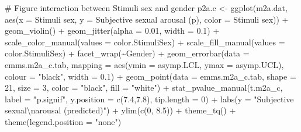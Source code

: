 \documentclass[
  bookmarksnumbered]{article}
\newenvironment{Shaded}{\begin{snugshade}}{\end{snugshade}}
\newcommand{\AttributeTok}[1]{\textcolor[rgb]{0.80,0.80,0.80}{#1}}
\newcommand{\CommentTok}[1]{\textcolor[rgb]{0.50,0.62,0.50}{#1}}
\newcommand{\DecValTok}[1]{\textcolor[rgb]{0.86,0.86,0.80}{#1}}
\newcommand{\FloatTok}[1]{\textcolor[rgb]{0.75,0.75,0.82}{#1}}
\newcommand{\FunctionTok}[1]{\textcolor[rgb]{0.94,0.94,0.56}{#1}}
\newcommand{\NormalTok}[1]{\textcolor[rgb]{0.80,0.80,0.80}{#1}}
\newcommand{\OtherTok}[1]{\textcolor[rgb]{0.94,0.94,0.56}{#1}}
\newcommand{\SpecialCharTok}[1]{\textcolor[rgb]{0.86,0.64,0.64}{#1}}
\newcommand{\StringTok}[1]{\textcolor[rgb]{0.80,0.58,0.58}{#1}}
\begin{document}
\begin{Shaded}
\begin{Highlighting}[]
\CommentTok{\# Figure interaction between Stimuli sex and gender}
\NormalTok{p2a.c }\OtherTok{\textless{}{-}} \FunctionTok{ggplot}\NormalTok{(m2a.dat, }\FunctionTok{aes}\NormalTok{(}\AttributeTok{x =} \StringTok{\textasciigrave{}}\AttributeTok{Stimuli sex}\StringTok{\textasciigrave{}}\NormalTok{, }
                             \AttributeTok{y =} \StringTok{\textasciigrave{}}\AttributeTok{Subjective sexual arousal (p)}\StringTok{\textasciigrave{}}\NormalTok{, }
                             \AttributeTok{color =} \StringTok{\textasciigrave{}}\AttributeTok{Stimuli sex}\StringTok{\textasciigrave{}}\NormalTok{)) }\SpecialCharTok{+}
  \FunctionTok{geom\_violin}\NormalTok{() }\SpecialCharTok{+}
  \FunctionTok{geom\_jitter}\NormalTok{(}\AttributeTok{alpha =} \FloatTok{0.01}\NormalTok{, }\AttributeTok{width =} \FloatTok{0.1}\NormalTok{) }\SpecialCharTok{+}
  \FunctionTok{scale\_color\_manual}\NormalTok{(}\AttributeTok{values =}\NormalTok{ color.StimuliSex) }\SpecialCharTok{+}
  \FunctionTok{scale\_fill\_manual}\NormalTok{(}\AttributeTok{values =}\NormalTok{ color.StimuliSex) }\SpecialCharTok{+}
  \FunctionTok{facet\_wrap}\NormalTok{(}\SpecialCharTok{\textasciitilde{}}\NormalTok{Gender) }\SpecialCharTok{+}
  \FunctionTok{geom\_errorbar}\NormalTok{(}\AttributeTok{data =}\NormalTok{ emms.m2a\_c.tab, }
                \AttributeTok{mapping =} \FunctionTok{aes}\NormalTok{(}\AttributeTok{ymin =}\NormalTok{ asymp.LCL, }\AttributeTok{ymax =}\NormalTok{ asymp.UCL), }
                \AttributeTok{colour =} \StringTok{"black"}\NormalTok{, }\AttributeTok{width =} \FloatTok{0.1}\NormalTok{) }\SpecialCharTok{+}
  \FunctionTok{geom\_point}\NormalTok{(}\AttributeTok{data =}\NormalTok{ emms.m2a\_c.tab, }
             \AttributeTok{shape =} \DecValTok{21}\NormalTok{, }\AttributeTok{size =} \DecValTok{3}\NormalTok{,}
             \AttributeTok{color =} \StringTok{"black"}\NormalTok{, }\AttributeTok{fill =} \StringTok{"white"}\NormalTok{) }\SpecialCharTok{+}
  \FunctionTok{stat\_pvalue\_manual}\NormalTok{(t.m2a\_c, }
                     \AttributeTok{label =} \StringTok{"p.signif"}\NormalTok{, }
                     \AttributeTok{y.position =} \FunctionTok{c}\NormalTok{(}\FloatTok{7.4}\NormalTok{,}\FloatTok{7.8}\NormalTok{), }
                     \AttributeTok{tip.length =} \DecValTok{0}\NormalTok{) }\SpecialCharTok{+}
  \FunctionTok{labs}\NormalTok{(}\AttributeTok{y =} \StringTok{"Subjective sexual}\SpecialCharTok{\textbackslash{}n}\StringTok{arousal (predicted)"}\NormalTok{) }\SpecialCharTok{+}
  \FunctionTok{ylim}\NormalTok{(}\FunctionTok{c}\NormalTok{(}\DecValTok{0}\NormalTok{, }\FloatTok{8.5}\NormalTok{)) }\SpecialCharTok{+}
  \FunctionTok{theme\_tq}\NormalTok{() }\SpecialCharTok{+}
  \FunctionTok{theme}\NormalTok{(}\AttributeTok{legend.position =} \StringTok{"none"}\NormalTok{)}


\end{Highlighting}
\end{Shaded}
\end{document}
